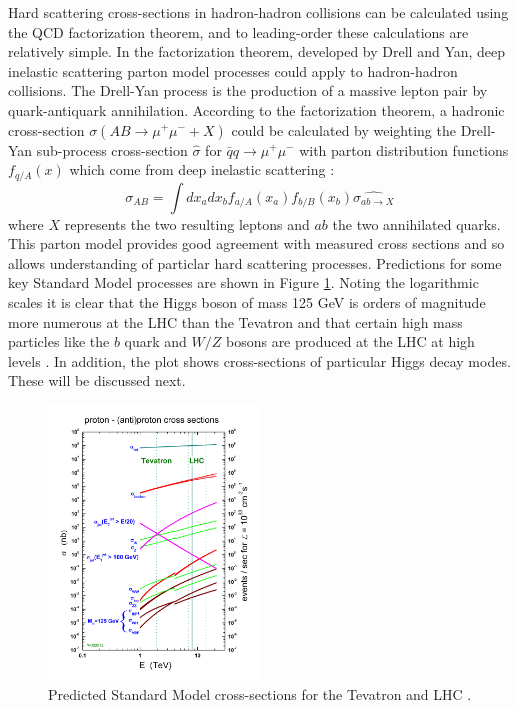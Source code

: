 Hard scattering cross-sections in hadron-hadron collisions can be calculated using the QCD factorization theorem, and to leading-order these calculations are relatively simple. In the factorization theorem, developed by Drell and Yan, deep inelastic scattering parton model processes could apply to hadron-hadron collisions. The Drell-Yan process is the production of a massive lepton pair by quark-antiquark annihilation. According to the factorization theorem, a hadronic cross-section $\sigma(AB\rightarrow \mu^+\mu^-+X)$ could be calculated by weighting the Drell-Yan sub-process cross-section $\hat{\sigma}$ for $\bar{q}q\rightarrow\mu^+\mu^-$ with parton distribution functions $f_{q/A}(x)$ which come from deep inelastic scattering \cite{Campbell}:
\begin{equation}
\sigma_{AB} = \int dx_a dx_b f_{a/A}(x_a)f_{b/B}(x_b)\hat{\sigma_{ab\rightarrow X}}
\end{equation}
where $X$ represents the two resulting leptons and $ab$ the two annihilated quarks. This parton model provides good agreement with measured cross sections and so allows understanding of particlar hard scattering processes. Predictions for some key Standard Model processes are shown in Figure \ref{fig:crosssection}. Noting the logarithmic scales it is clear that the Higgs boson of mass 125 GeV is orders of magnitude more numerous at the LHC than the Tevatron and that certain high mass particles like the $b$ quark and $W/Z$ bosons are produced at the LHC at high levels \cite{Campbell}. In addition, the plot shows cross-sections of particular Higgs decay modes. These will be discussed next.
 
\begin{figure}[H]
        \centering
    \includegraphics[width=0.5\textwidth] {Pictures/crosssections.jpg}\hspace{1cm}
    \caption{Predicted Standard Model cross-sections for the Tevatron and LHC \cite{Stirling}.}
    \label{fig:crosssection}
\end{figure}

